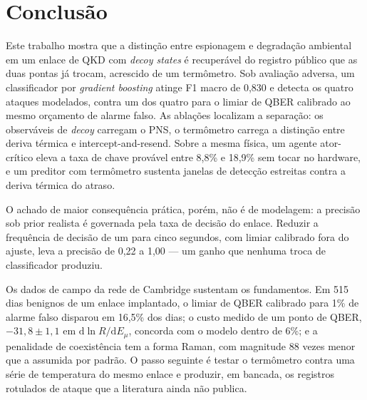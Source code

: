 \documentclass[12pt]{article}
\begin{document}
\section{Conclusão}

Este trabalho mostra que a distinção entre espionagem e degradação ambiental em um
enlace de QKD com \emph{decoy states} é recuperável do registro público que as
duas pontas já trocam, acrescido de um termômetro. Sob avaliação adversa, um
classificador por \emph{gradient boosting} atinge F1 macro de 0,830 e detecta os
quatro ataques modelados, contra um dos quatro para o limiar de QBER calibrado ao
mesmo orçamento de alarme falso. As ablações localizam a separação: os
observáveis de \emph{decoy} carregam o PNS, o termômetro carrega a distinção entre
deriva térmica e intercept-and-resend. Sobre a mesma física, um agente
ator-crítico eleva a taxa de chave provável entre 8,8\% e 18,9\% sem tocar no
hardware, e um preditor com termômetro sustenta janelas de detecção estreitas
contra a deriva térmica do atraso.

O achado de maior consequência prática, porém, não é de modelagem: a precisão sob
prior realista é governada pela taxa de decisão do enlace. Reduzir a frequência de
decisão de um para cinco segundos, com limiar calibrado fora do ajuste, leva a
precisão de 0,22 a 1,00 --- um ganho que nenhuma troca de classificador produziu.

Os dados de campo da rede de Cambridge sustentam os fundamentos. Em 515 dias
benignos de um enlace implantado, o limiar de QBER calibrado para 1\% de alarme
falso disparou em 16,5\% dos dias; o custo medido de um ponto de QBER,
$-31{,}8 \pm 1{,}1$ em $\mathrm{d}\ln R/\mathrm{d}E_\mu$, concorda com o modelo
dentro de 6\%; e a penalidade de coexistência tem a forma Raman, com magnitude 88
vezes menor que a assumida por padrão. O passo seguinte é testar o termômetro
contra uma série de temperatura do mesmo enlace e produzir, em bancada, os
registros rotulados de ataque que a literatura ainda não publica.

\vspace{1.0em}
\end{document}
